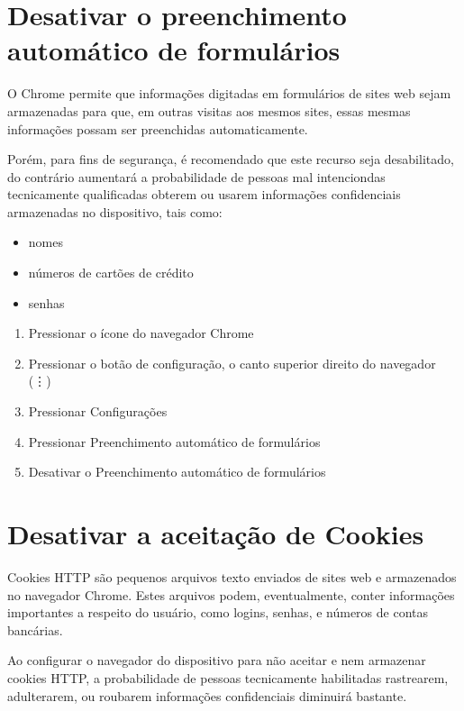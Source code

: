 \section{Desativar o preenchimento autom\'atico de formul\'arios}

O Chrome permite que informa\c c\~oes digitadas em formul\'arios de sites web sejam armazenadas para que, em outras visitas aos mesmos sites, essas mesmas informa\c c\~oes possam ser preenchidas automaticamente. 

Por\'em, para fins de seguran\c ca, \'e recomendado que este recurso seja desabilitado, do contr\'ario aumentar\'a a probabilidade de pessoas mal intenciondas tecnicamente qualificadas obterem ou usarem informa\c c\~oes confidenciais armazenadas no dispositivo, tais como:

\begin{itemize}
\item nomes
\item n\'umeros de cart\~oes de cr\'edito
\item senhas
\end{itemize}

\begin{enumerate}
\item Pressionar o \'icone do navegador Chrome
\item Pressionar o bot\~ao de configura\c c\~ao, o canto superior direito do navegador (\vdots)
\item Pressionar Configura\c c\~oes
\item Pressionar Preenchimento autom\'atico de formul\'arios
\item Desativar o Preenchimento autom\'atico de formul\'arios
\end{enumerate}

\section{Desativar a aceita\c c\~ao de Cookies}

Cookies HTTP s\~ao pequenos arquivos texto enviados de sites web e armazenados no navegador Chrome. Estes arquivos podem, eventualmente, conter informa\c c\~oes importantes a respeito do usu\'ario, como logins, senhas, e n\'umeros de contas banc\'arias. 

Ao configurar o navegador do dispositivo para n\~ao aceitar e nem armazenar cookies HTTP, a probabilidade de pessoas tecnicamente habilitadas rastrearem, adulterarem, ou roubarem informa\c c\~oes confidenciais diminuir\'a bastante.

